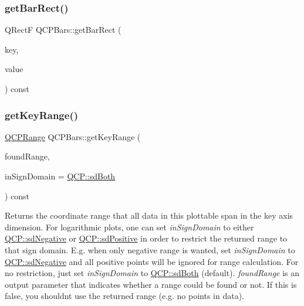 \subsubsection{\texorpdfstring{getBarRect()}{getBarRect()}}
{\footnotesize\ttfamily Q\+RectF Q\+C\+P\+Bars\+::get\+Bar\+Rect (\begin{DoxyParamCaption}\item[{double}]{key,  }\item[{double}]{value }\end{DoxyParamCaption}) const\hspace{0.3cm}{\ttfamily [protected]}}

\mbox{\label{class_q_c_p_bars_ac5a3854774d9d9cd129b1eae1426de2d}} 
\subsubsection{\texorpdfstring{getKeyRange()}{getKeyRange()}}
{\footnotesize\ttfamily \mbox{\hyperlink{class_q_c_p_range}{Q\+C\+P\+Range}} Q\+C\+P\+Bars\+::get\+Key\+Range (\begin{DoxyParamCaption}\item[{bool \&}]{found\+Range,  }\item[{\mbox{\hyperlink{namespace_q_c_p_afd50e7cf431af385614987d8553ff8a9}{Q\+C\+P\+::\+Sign\+Domain}}}]{in\+Sign\+Domain = {\ttfamily \mbox{\hyperlink{namespace_q_c_p_afd50e7cf431af385614987d8553ff8a9aa38352ef02d51ddfa4399d9551566e24}{Q\+C\+P\+::sd\+Both}}} }\end{DoxyParamCaption}) const\hspace{0.3cm}{\ttfamily [virtual]}}

Returns the coordinate range that all data in this plottable span in the key axis dimension. For logarithmic plots, one can set {\itshape in\+Sign\+Domain} to either \mbox{\hyperlink{namespace_q_c_p_afd50e7cf431af385614987d8553ff8a9a2d18af0bc58f6528d1e82ce699fe4829}{Q\+C\+P\+::sd\+Negative}} or \mbox{\hyperlink{namespace_q_c_p_afd50e7cf431af385614987d8553ff8a9a584784b75fb816abcc627cf743bb699f}{Q\+C\+P\+::sd\+Positive}} in order to restrict the returned range to that sign domain. E.\+g. when only negative range is wanted, set {\itshape in\+Sign\+Domain} to \mbox{\hyperlink{namespace_q_c_p_afd50e7cf431af385614987d8553ff8a9a2d18af0bc58f6528d1e82ce699fe4829}{Q\+C\+P\+::sd\+Negative}} and all positive points will be ignored for range calculation. For no restriction, just set {\itshape in\+Sign\+Domain} to \mbox{\hyperlink{namespace_q_c_p_afd50e7cf431af385614987d8553ff8a9aa38352ef02d51ddfa4399d9551566e24}{Q\+C\+P\+::sd\+Both}} (default). {\itshape found\+Range} is an output parameter that indicates whether a range could be found or not. If this is false, you shouldn\textquotesingle{}t use the returned range (e.\+g. no points in data).

